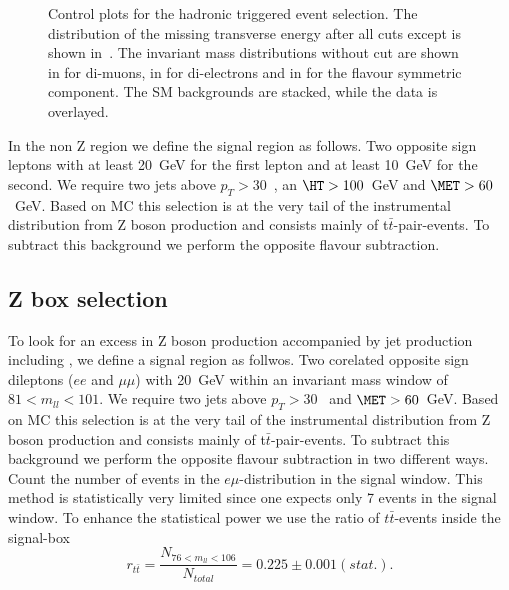 \begin{figure}[hbtp]
  \hfill
  \hfill
  \hfill
  \hfill
  \caption{Control plots for the hadronic triggered event selection. %
      The distribution of the missing transverse energy after all cuts except \MET is shown in~.  The invariant mass distributions without \MET cut are shown in  for di-muons, in  for di-electrons and in  for the flavour symmetric component. The SM backgrounds are stacked, while the data is overlayed.}
\end{figure}

In the non Z region we define the signal region as follows.
Two opposite sign leptons with
at least 20~GeV for the first lepton and at least 10~GeV for the second. 
We require two jets above $p_T > 30$~\GeV,
an $\HT> 100$~GeV and $\MET> 60$~GeV. Based on MC this selection is at the very tail of 
the instrumental \MET distribution from Z boson production and consists mainly
of t$\bar{t}$-pair-events.
To subtract this background we perform the opposite flavour subtraction.

\subsection{Z box selection}
To look for an excess in Z boson production accompanied by jet production including \MET, 
we define a signal region as follwos. Two corelated opposite sign dileptons ($ee$ and $\mu\mu$)
 with 20~GeV within an invariant mass window of $81 < m_{ll} < 101$.
 We require two jets above $p_T > 30$~\GeV
and $\MET> 60$~GeV. Based on MC this selection is at the very tail of 
the instrumental \MET distribution from Z boson production and consists mainly
of t$\bar{t}$-pair-events.
To subtract this background we perform the opposite flavour subtraction in two different ways.
Count the number of events in the $e\mu$-distribution in the signal window. This method
is statistically very limited since one expects only 7 events in the signal window.
To enhance the statistical power we use the ratio of $t\bar{t}$-events inside the
signal-box 
\begin{equation}
r_{t\bar{t}} = \frac{N_{76<m_{ll}<106}}{N_{total}} = 0.225 \pm 0.001 (stat.).
\end{equation}

